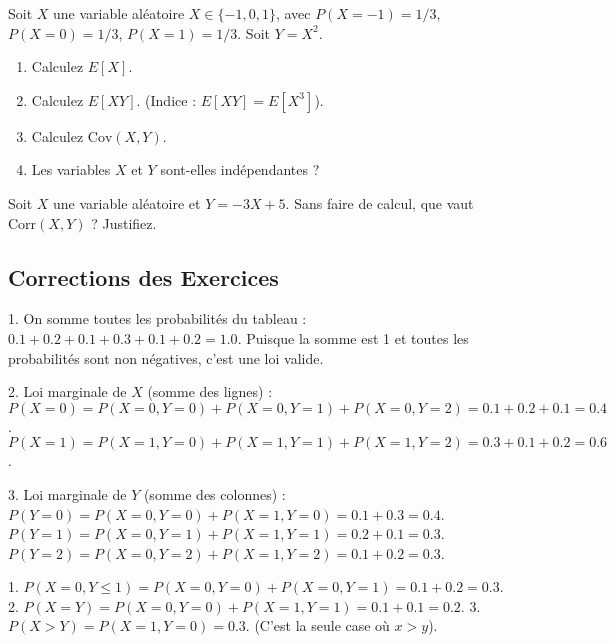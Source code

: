 \begin{exercicebox}
Soit $X$ une variable aléatoire $X \in \{-1, 0, 1\}$, avec $P(X=-1)=1/3$, $P(X=0)=1/3$, $P(X=1)=1/3$.
Soit $Y = X^2$.
\begin{enumerate}
    \item Calculez $E[X]$.
    \item Calculez $E[XY]$. (Indice : $E[XY] = E[X^3]$).
    \item Calculez $\text{Cov}(X,Y)$.
    \item Les variables $X$ et $Y$ sont-elles indépendantes ?
\end{enumerate}
\end{exercicebox}

\begin{exercicebox}
Soit $X$ une variable aléatoire et $Y = -3X + 5$.
Sans faire de calcul, que vaut $\text{Corr}(X,Y)$ ? Justifiez.
\end{exercicebox}

\subsection{Corrections des Exercices}


\begin{correctionbox}
1.  On somme toutes les probabilités du tableau :
    $0.1 + 0.2 + 0.1 + 0.3 + 0.1 + 0.2 = 1.0$.
    Puisque la somme est 1 et toutes les probabilités sont non négatives, c'est une loi valide.

2.  Loi marginale de $X$ (somme des lignes) :
    $P(X=0) = P(X=0, Y=0) + P(X=0, Y=1) + P(X=0, Y=2) = 0.1 + 0.2 + 0.1 = 0.4$.
    $P(X=1) = P(X=1, Y=0) + P(X=1, Y=1) + P(X=1, Y=2) = 0.3 + 0.1 + 0.2 = 0.6$.

3.  Loi marginale de $Y$ (somme des colonnes) :
    $P(Y=0) = P(X=0, Y=0) + P(X=1, Y=0) = 0.1 + 0.3 = 0.4$.
    $P(Y=1) = P(X=0, Y=1) + P(X=1, Y=1) = 0.2 + 0.1 = 0.3$.
    $P(Y=2) = P(X=0, Y=2) + P(X=1, Y=2) = 0.1 + 0.2 = 0.3$.
\end{correctionbox}

\begin{correctionbox}
1.  $P(X=0, Y \le 1) = P(X=0, Y=0) + P(X=0, Y=1) = 0.1 + 0.2 = 0.3$.
2.  $P(X=Y) = P(X=0, Y=0) + P(X=1, Y=1) = 0.1 + 0.1 = 0.2$.
3.  $P(X > Y) = P(X=1, Y=0) = 0.3$. (C'est la seule case où $x > y$).
\end{correctionbox}

